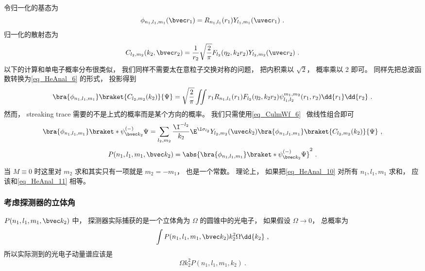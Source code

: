 令归一化的基态为
\begin{equation}
\phi_{n_1, l_1, m_1}(\bvec r_1) = R_{n_1,l_1}(r_1)Y_{l_1,m_1}(\uvec r_1)~.
\end{equation}
归一化的散射态为
\begin{equation}
C_{l_2, m_2}(k_2, \bvec r_2) = \frac{1}{r_2}\sqrt{\frac{2}{\pi}} F_{l_2}(\eta_2, k_2 r_2) Y_{l_2, m_2} (\uvec r_2)~.
\end{equation}
以下的计算和单电子概率分布很类似， 我们同样不需要太在意粒子交换对称的问题， 把内积乘以 $\sqrt{2}$， 概率乘以 2 即可。 同样先把总波函数转换为\autoref{eq_HeAnal_6} 的形式， 投影得到
\begin{equation}\label{eq_HeAnal_36}
\bra{\phi_{n_1, l_1, m_1}}\braket{C_{l_2, m_2}(k_2)}{\Psi} = \sqrt{\frac{2}{\pi}} \iint r_1 R_{n_1,l_1}(r_1) F_{l_2}(\eta_2, k_2 r_2) \psi_{l_1, l_2}^{m_1, m_2}(r_1, r_2) \dd{r_1} \dd{r_2}~.
\end{equation}
然而， streaking trace 需要的不是上式的概率而是某个方向的概率。 我们只需使用\autoref{eq_CulmWf_6}~ 做线性组合即可
\begin{equation}
\bra{\phi_{n_1, l_1, m_1}}\braket*{\psi_{\bvec k_2}^{(-)}}{\Psi} = \sum_{l_2,m_2} \frac{\I^{-l_2}}{k_2} \E^{\I\sigma_{l_2}} Y_{l_2,m_2}(\uvec k_2) \bra{\phi_{n_1, l_1, m_1}}\braket{C_{l_2, m_2}(k_2)}{\Psi} ~,
\end{equation}
\begin{equation}\label{eq_HeAnal_10}
P(n_1, l_1, m_1, \bvec k_2) = \abs{\bra{\phi_{n_1, l_1, m_1}}\braket*{\psi_{\bvec k_2}^{(-)}}{\Psi}}^2~.
\end{equation}

当 $M \equiv 0$ 时这里对 $m_2$ 求和其实只有一项就是 $m_2 = - m_1$， 也是一个常数。 理论上， 如果把\autoref{eq_HeAnal_10} 对所有 $n_1, l_1, m_1$ 求和， 应该和\autoref{eq_HeAnal_11} 相等。


\subsubsection{考虑探测器的立体角}
$P(n_1, l_1, m_1, \bvec k_2)$ 中， 探测器实际捕获的是一个立体角为 $\Omega$ 的圆锥中的光电子， 如果假设 $\Omega \to 0$， 总概率为
\begin{equation}
\int P(n_1, l_1, m_1, \bvec k_2) k_2^2 \Omega \dd{k_2}~,
\end{equation}
所以实际测到的光电子动量谱应该是
\begin{equation}
\Omega k_2^2 P(n_1, l_1, m_1, k_2)~.
\end{equation}

